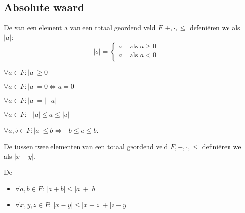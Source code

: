 \documentclass[main.tex]{subfiles}
\begin{document}
\subsection{Absolute waard}
\label{sec:absolute-waarde}

\begin{de}
  De  van een element $a$ van een totaal geordend veld $F,+,\cdot,\le$ defeni\"eren we als $|a|$:
  \[ 
  |a| = 
  \left\{
    \begin{array}{cl}
      a &\text{ als } a\ge 0\\
      a &\text{ als } a< 0\\
    \end{array}
  \right.
  \]
\end{de}

\begin{pr}
  $\forall a\in F: |a| \ge 0$
\end{pr}

\begin{pr}
  $\forall a\in F: |a| = 0 \Leftrightarrow a = 0$
\end{pr}

\begin{pr}
  $\forall a\in F: |a| = |-a|$
\end{pr}

\begin{pr}
  $\forall a\in F: -|a| \le a \le |a|$
\end{pr}

\begin{pr}
  $\forall a,b\in F: |a| \le b \Leftrightarrow -b \le a \le b$.
\end{pr}

\begin{de}
  De  tussen twee elementen van een totaal geordend veld $F,+,\cdot,\le$ defini\"eren we als $|x-y|$.
\end{de}

\begin{pr}
  De \\
  \begin{itemize}
  \item $\forall a,b\in F:\ |a+b| \le |a| + |b|$
  \item $\forall x,y,z\in F:\ |x-y| \le |x-z| + |z-y|$
  \end{itemize}

\end{pr}
\end{document}
